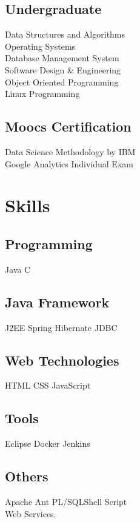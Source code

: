 \documentclass[]{deedy-resume-openfont}
\begin{document}
\begin{minipage}[t]{0.33\textwidth}
\subsection{Undergraduate}
Data Structures and Algorithms \\
Operating Systems \\
Database Management System\\
Software Design \& Engineering \\
Object Oriented Programming \\
Linux Programming \\
\sectionsep

\subsection{Moocs Certification}
Data Science Methodology by IBM \\
Google Analytics Individual Exam\\
\sectionsep



\section{Skills}
\subsection{Programming}
Java \textbullet{} C\\
\sectionsep
\subsection{Java Framework}
J2EE\textbullet{} Spring\textbullet{} Hibernate\textbullet{} JDBC
\sectionsep
\subsection{Web Technologies}
HTML\textbullet{} CSS\textbullet{} JavaScript
\sectionsep
\subsection{Tools}
Eclipse\textbullet{} Docker\textbullet{} Jenkins
\sectionsep
\subsection{Others}
Apache Ant \textbullet{}PL/SQL\textbullet{}Shell Script\\ Web Services.



\end{minipage}
\end{document}
